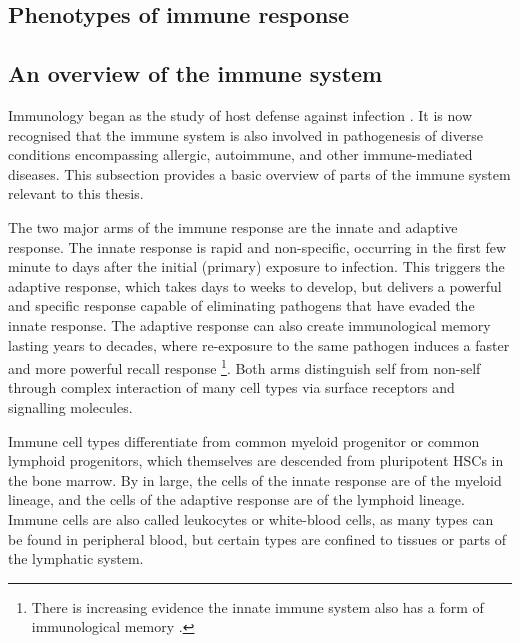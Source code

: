 \begin{outline}

\section{Phenotypes of immune response}

\subsection{An overview of the immune system}

Immunology began as the study of host defense against infection \autocite{murphy2016JanewayImmunobiology}.
It is now recognised that the immune system is also involved in pathogenesis of diverse conditions encompassing allergic, autoimmune, and other immune-mediated diseases.
This subsection provides a basic overview of parts of the immune system relevant to this thesis.

The two major arms of the immune response are the innate and adaptive response.
The innate response is rapid and non-specific, 
occurring in the first few minute to days after the initial (primary) exposure to infection.
This triggers the adaptive response, which takes days to weeks to develop, 
but delivers a powerful and specific response capable of eliminating pathogens that have evaded the innate response.
The adaptive response can also create immunological memory lasting years to decades,
where re-exposure to the same pathogen induces a faster and more powerful recall response%
\footnote{
    There is increasing evidence the innate immune system also has a form of immunological memory \autocite{dominguez-andres2020SpecificsInnateImmune}.
}.
Both arms distinguish self from non-self through complex interaction of many cell types via surface receptors and signalling molecules.

Immune cell types differentiate from common myeloid progenitor or common lymphoid progenitors,
which themselves are descended from pluripotent \glspl{HSC} in the bone marrow.
By in large, the cells of the innate response are of the myeloid lineage, 
and the cells of the adaptive response are of the lymphoid lineage.
Immune cells are also called leukocytes or white-blood cells, 
as many types can be found in peripheral blood, 
but certain types are confined to tissues or parts of the lymphatic system.


\end{outline}
